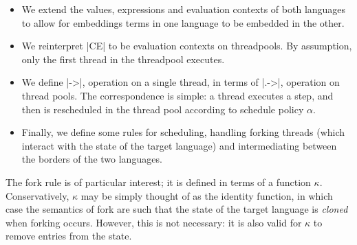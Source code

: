 \begin{itemize}
    \item We extend the values, expressions and evaluation contexts of both languages to allow for embeddings terms in one language to be embedded in the other.  
    \item We reinterpret |CE| to be evaluation contexts on threadpools.  By assumption, only the first thread in the threadpool executes.
    \item We define |->|, operation on a single thread, in terms of |.->|, operation on thread pools.  The correspondence is simple: a thread executes a step, and then is rescheduled in the thread pool according to schedule policy $\alpha$. 
    \item Finally, we define some rules for scheduling, handling forking threads (which interact with the state of the target language) and intermediating between the borders of the two languages. 
\end{itemize}

The fork rule is of particular interest; it is defined in terms of a function $\kappa$.
Conservatively, $\kappa$ may be simply thought of as the identity function, in which
case the semantics of fork are such that the state of the target language is \emph{cloned}
when forking occurs.  However, this is not necessary: it is also valid for $\kappa$
to remove entries from the state.  

